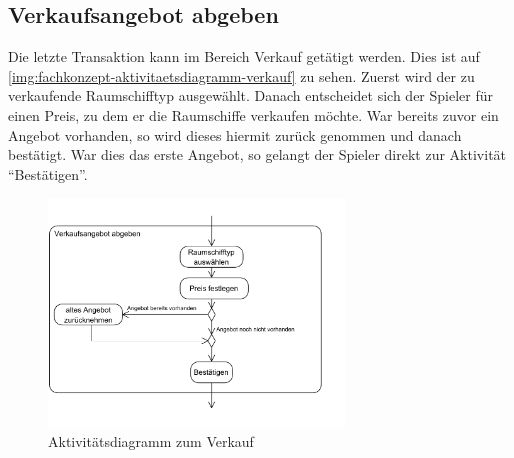 \subsection{Verkaufsangebot abgeben}
\label{sec:fachkonzept-aktivitaetsdiagramm-verkauf}

Die letzte Transaktion kann im Bereich Verkauf getätigt werden. Dies ist auf \vref{img:fachkonzept-aktivitaetsdiagramm-verkauf} zu sehen. Zuerst wird der zu verkaufende Raumschifftyp ausgewählt. Danach entscheidet sich der Spieler für einen Preis, zu dem er die Raumschiffe verkaufen möchte. War bereits zuvor ein Angebot vorhanden, so wird dieses hiermit zurück genommen und danach bestätigt. War dies das erste Angebot, so gelangt der Spieler direkt zur Aktivität “Bestätigen”.

\begin{figure}[h]
  \centering
    \includegraphics[trim = 0cm 1cm 1cm 1cm, width=0.7\textwidth]{30_Fachkonzept/15_aktivitaetsdiagramm/activity5.pdf}
  \caption{Aktivitätsdiagramm zum Verkauf}
  \label{img:fachkonzept-aktivitaetsdiagramm-verkauf}
\end{figure}